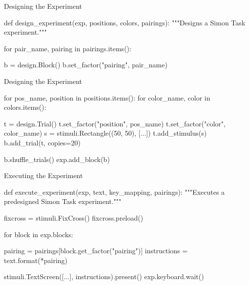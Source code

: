 \begin{frame}[fragile]{Designing the Experiment}

    \begin{pythoncode}
def design_experiment(exp, positions, colors, pairings):
    """Designs a Simon Task experiment."""

    for pair_name, pairing in pairings.items():
        
        b = design.Block()
        b.set_factor("pairing", pair_name) 

    \end{pythoncode}


\end{frame}


\begin{frame}[fragile]{Designing the Experiment}

    \begin{pythoncode}
for pos_name, position in positions.items():
    for color_name, color in colors.items():

        t = design.Trial()
        t.set_factor("position", pos_name)
        t.set_factor("color", color_name)
        s = stimuli.Rectangle((50, 50), [...])
        t.add_stimulus(s)
        b.add_trial(t, copies=20)

b.shuffle_trials()
exp.add_block(b)

    \end{pythoncode}


\end{frame}


\begin{frame}[fragile]{Executing the Experiment}

    \begin{pythoncode}
def execute_experiment(exp, text, key_mapping, pairings):
    """Executes a predesigned Simon Task experiment."""

    fixcross = stimuli.FixCross()
    fixcross.preload()

    for block in exp.blocks:

        pairing = pairings[block.get_factor("pairing")]
        instructions = text.format(*pairing)

        stimuli.TextScreen([...], instructions).present()
        exp.keyboard.wait()
    \end{pythoncode}

\end{frame}

